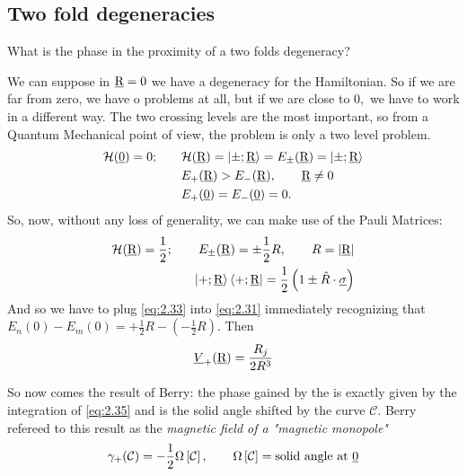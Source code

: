\subsection{Two fold degeneracies}
What is the phase in the proximity of a two folds degeneracy?

We can suppose in $ \underline{\textrm{R}}=0 $ we have a degeneracy for the Hamiltonian. So if we are far from zero, we have o problems at all, but if we are close to $ 0, $ we have to work in a different way. The two crossing levels are the most important, so from a Quantum Mechanical point of view, the problem is only a two level problem.
\begin{align}
	\mathcal{H}(\underline{0})=0; \qquad & \mathcal{H}(\underline{\textrm{R}})=\Ket{\pm;\underline{\textrm{R}}}=E_{\pm}(\underline{\textrm{R}})=\Ket{\pm;\underline{\textrm{R}}}\\
	& E_{+}(\underline{\textrm{R}})>E_-(\underline{\textrm{R}}),\qquad \underline{\textrm{R}}\neq 0\\
	& E_{+}(\underline{0})=E_{-}(\underline{0})=0.
\end{align} 
So, now, without any loss of generality, we can make use of the Pauli Matrices:
\begin{align}
	\mathcal{H}(\underline{\textrm{R}})=\dfrac{1}{2};\qquad E_{\pm}(\underline{\textrm{R}})=\pm\dfrac{1}{2}R, \qquad R=\lvert\underline{\textrm{R}}\rvert\\
	\Ket{+;\underline{\textrm{R}}}\Bra{+;\underline{\textrm{R}}}=\dfrac{1}{2}\left(1\pm \hat{R}\cdot\underline{\sigma} \right)\label{eq:2.33}
\end{align}
And so we have to plug \eqref{eq:2.33} into \eqref{eq:2.31} immediately recognizing that $ E_n(0)-E_m(0)=+\frac{1}{2}R-(-\frac{1}{2}R) $. Then 
\begin{equation}
\underline{V}_{+}(\underline{\textrm{R}})=\frac{R_j}{2R^3}
\label{eq:2.35}
\end{equation}

So now comes the result of Berry: the phase gained by the \wf is exactly given by the integration of \eqref{eq:2.35} and is the solid angle shifted by the curve $ \mathcal{C} $. Berry refereed to this result as the \textit{magnetic field of a "magnetic monopole"}
\begin{equation}
\gamma_{+}(\mathcal{C})=-\dfrac{1}{2}\Omega\left[\mathcal{C}\right], \qquad \Omega\left[\mathcal{C}\right]=\text{solid angle at \underline{0}}
\end{equation}